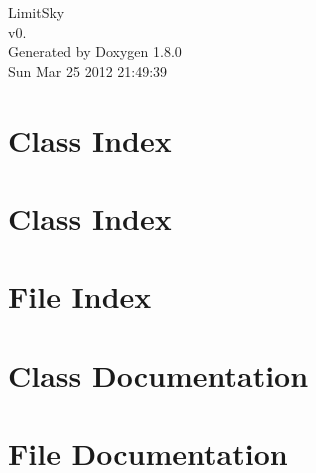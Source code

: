 \documentclass{book}
\begin{document}
\hypersetup{pageanchor=false,citecolor=blue}
\begin{titlepage}
\vspace*{7cm}
\begin{center}
{\Large Limit\-Sky \\[1ex]\large v0. }\\
\vspace*{1cm}
{\large Generated by Doxygen 1.8.0}\\
\vspace*{0.5cm}
{\small Sun Mar 25 2012 21:49:39}\\
\end{center}
\end{titlepage}
\clearemptydoublepage
{}
\tableofcontents
\clearemptydoublepage
{}
\hypersetup{pageanchor=true,citecolor=blue}
\chapter{Class Index}

\chapter{Class Index}

\chapter{File Index}

\chapter{Class Documentation}














\chapter{File Documentation}














































\printindex
\end{document}
